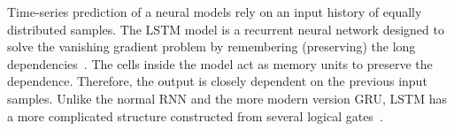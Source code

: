 Time-series prediction of a neural models rely on an input history of equally distributed samples.
{The LSTM model is a recurrent neural network designed to solve the vanishing gradient problem by remembering (preserving) the long dependencies~\cite{rasifaghihi_predictive_2020}.}
The cells inside the model act as memory units to preserve the dependence.
Therefore, the output is closely dependent on the previous input samples.
Unlike the normal RNN and the more modern version GRU, LSTM has a more complicated structure constructed from several logical gates~\cite{LSTM_Hochreiter1997}.

